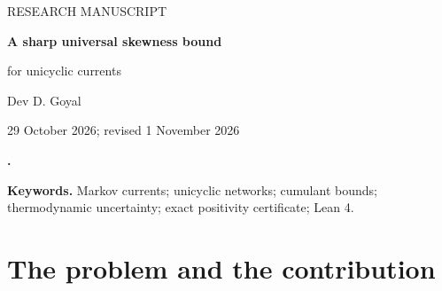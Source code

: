 \documentclass[11pt,a4paper]{article}
\numberwithin{equation}{section}
\theoremstyle{remark}
\begin{document}
\thispagestyle{plain}
\begin{center}
  {\color{accent}\sffamily\small RESEARCH MANUSCRIPT}\par\vspace{9pt}
  {\color{ink}\LARGE\bfseries A sharp universal skewness bound\par
  for unicyclic currents}\par\vspace{10pt}
  {\small Dev D. Goyal}\par\vspace{5pt}
  {\small 29 October 2026; revised 1 November 2026}
\end{center}
\vspace{4pt}
\begin{tcolorbox}[colback=pale,colframe=accent,boxrule=0.5pt,arc=0pt,
  left=9pt,right=9pt,top=7pt,bottom=7pt]
\textbf{\VerificationHeading.} \VerificationText
\end{tcolorbox}
\begin{abstract}
For a finite continuous-time Markov chain on a bidirectional ring, let $C_k$
denote the $k$th cumulant per unit time of the net crossing count of a fixed
edge. Ptaszy\'nski~\cite{Ptaszynski2022} proposed the dimension-independent
interval $-1/16\le C_3/C_1\le1$ for such winding currents. We prove it for
every ring with at least three states, arbitrary strictly positive rates and
nonzero affinity; both constants are sharp. The proof combines the known
positive midpoint spectrum of the tilted generator with a finite-ring proof
of the thermodynamic uncertainty relation. The lower bound then reduces to a
two-variable polynomial inequality, certified by exact positive integer
coefficients on three rational intervals, which are listed in full. The
conventional two-state and one-state cases are included as supplements.
A Lean~4 development verifies the interval for the actual finite-rate
tilted matrix, including existence of its local eigenvalue branch; the
identification with long-time stochastic cumulants and the sharpness of the
constants rest on conventional proofs given here.
\end{abstract}
\noindent\textbf{Keywords.} Markov currents; unicyclic networks; cumulant
bounds; thermodynamic uncertainty; exact positivity certificate; Lean 4.

\section{The problem and the contribution}
\end{document}
